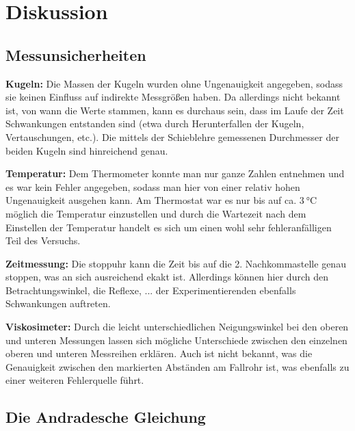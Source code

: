 

\section{Diskussion}

\subsection[]{Messunsicherheiten}
\textbf{Kugeln:}
Die Massen der Kugeln wurden ohne Ungenauigkeit angegeben, sodass sie keinen Einfluss auf indirekte Messgrößen haben.
Da allerdings nicht bekannt ist, von wann die Werte stammen, kann es durchaus sein, dass im Laufe der Zeit Schwankungen entstanden sind
(etwa durch Herunterfallen der Kugeln, Vertauschungen, etc.).
Die mittels der Schieblehre gemessenen Durchmesser der beiden Kugeln sind hinreichend genau.

\textbf{Temperatur:}
Dem Thermometer konnte man nur ganze Zahlen entnehmen und es war kein Fehler angegeben, sodass man hier von einer relativ hohen Ungenauigkeit ausgehen kann.
Am Thermostat war es nur bis auf ca. $\qty{3}{\degreeCelsius}$ möglich die Temperatur einzustellen und durch die Wartezeit nach dem Einstellen der Temperatur
handelt es sich um einen wohl sehr fehleranfälligen Teil des Versuchs.

\textbf{Zeitmessung:}
Die stoppuhr kann die Zeit bis auf die 2. Nachkommastelle genau stoppen, was an sich ausreichend ekakt ist.
Allerdings können hier durch den Betrachtungswinkel, die Reflexe, ... der Experimentierenden ebenfalls Schwankungen auftreten.

\textbf{Viskosimeter:}
Durch die leicht unterschiedlichen Neigungswinkel bei den oberen und unteren Messungen lassen sich mögliche Unterschiede zwischen den einzelnen oberen und
unteren Messreihen erklären.
Auch ist nicht bekannt, was die Genauigkeit zwischen den markierten Abständen am Fallrohr ist, was ebenfalls zu einer weiteren Fehlerquelle führt.


\subsection[]{Die Andradesche Gleichung}

